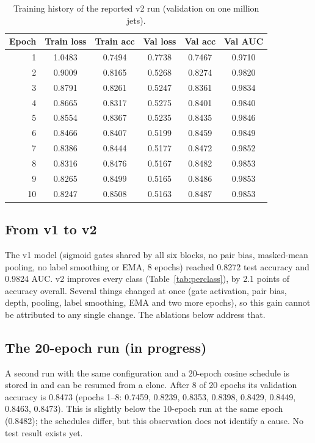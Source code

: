 \documentclass[11pt,a4paper]{article}
\newcommand{\code}[1]{\texttt{\small\detokenize{#1}}}
\numberwithin{equation}{section}
\begin{document}
\begin{table}[ht]
\centering\small
\begin{tabular}{rccccc}
\toprule Epoch & Train loss & Train acc & Val loss & Val acc & Val AUC\\ \midrule
1 & 1.0483 & 0.7494 & 0.7738 & 0.7467 & 0.9710\\
2 & 0.9009 & 0.8165 & 0.5268 & 0.8274 & 0.9820\\
3 & 0.8791 & 0.8261 & 0.5247 & 0.8361 & 0.9834\\
4 & 0.8665 & 0.8317 & 0.5275 & 0.8401 & 0.9840\\
5 & 0.8554 & 0.8367 & 0.5235 & 0.8435 & 0.9846\\
6 & 0.8466 & 0.8407 & 0.5199 & 0.8459 & 0.9849\\
7 & 0.8386 & 0.8444 & 0.5177 & 0.8472 & 0.9852\\
8 & 0.8316 & 0.8476 & 0.5167 & 0.8482 & 0.9853\\
9 & 0.8265 & 0.8499 & 0.5165 & 0.8486 & 0.9853\\
10 & 0.8247 & 0.8508 & 0.5163 & 0.8487 & 0.9853\\
\bottomrule
\end{tabular}
\caption{Training history of the reported v2 run (validation on one million jets).}
\label{tab:history}
\end{table}

\subsection{From v1 to v2}
The v1 model (sigmoid gates shared by all six blocks, no pair bias, masked-mean pooling, no label
smoothing or EMA, 8 epochs) reached 0.8272 test accuracy and 0.9824 AUC. v2 improves every class
(Table~\ref{tab:perclass}), by 2.1 points of accuracy overall. Several things changed at once
(gate activation, pair bias, depth, pooling, label smoothing, EMA and two more epochs), so this gain
cannot be attributed to any single change. The ablations below address that.

\subsection{The 20-epoch run (in progress)}
A second run with the same configuration and a 20-epoch cosine schedule is stored in
\code{checkpoints/v2_shared_10M_20ep/} and can be resumed from a clone. After 8 of 20 epochs its
validation accuracy is 0.8473 (epochs 1--8: 0.7459, 0.8239, 0.8353, 0.8398, 0.8429, 0.8449,
0.8463, 0.8473). This is slightly below the 10-epoch run at the same epoch
(0.8482); the schedules differ, but this observation does not identify a cause.
No test result exists yet.
\end{document}

